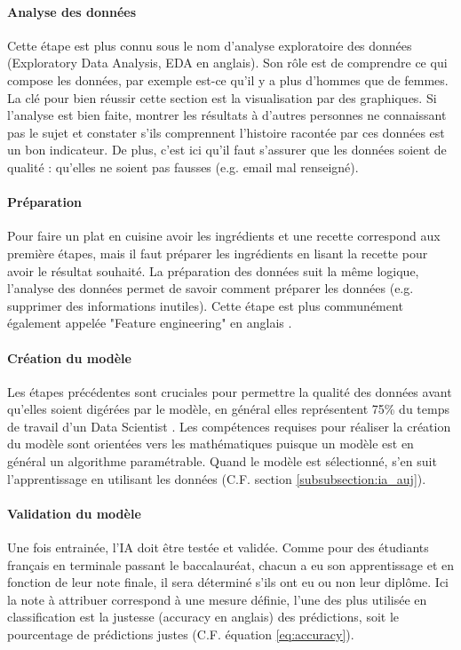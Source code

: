 \documentclass[10pt, french, a4paper]{article}
\begin{document}
\paragraph{Analyse des données}
Cette étape est plus connu sous le nom d'analyse exploratoire des données (Exploratory Data Analysis, EDA en anglais). Son rôle est de comprendre ce qui compose les données, par exemple est-ce qu'il y a plus d'hommes que de femmes. La clé pour bien réussir cette section est la visualisation par des graphiques. Si l'analyse est bien faite, montrer les résultats à d'autres personnes ne connaissant pas le sujet et constater s'ils comprennent l'histoire racontée par ces données est un bon indicateur. De plus, c'est ici qu'il faut s'assurer que les données soient de qualité : qu'elles ne soient pas fausses (e.g. email mal renseigné).

\paragraph{Préparation}
Pour faire un plat en cuisine avoir les ingrédients et une recette correspond aux première étapes, mais il faut préparer les ingrédients en lisant la recette pour avoir le résultat souhaité. La préparation des données suit la même logique, l'analyse des données permet de savoir comment préparer les données (e.g. supprimer des informations inutiles). Cette étape est plus communément également appelée "Feature engineering" en anglais \citep{mayo_machine_2018}.

\paragraph{Création du modèle}
Les étapes précédentes sont cruciales pour permettre la qualité des données avant qu'elles soient digérées par le modèle, en général elles représentent 75\% du temps de travail d'un Data Scientist \citep{figure_eight_state_2019}. Les compétences requises pour réaliser la création du modèle sont orientées vers les mathématiques puisque un modèle est en général un algorithme paramétrable. Quand le modèle est sélectionné, s'en suit l'apprentissage en utilisant les données (C.F. section \ref{subsubsection:ia_auj}).

\paragraph{Validation du modèle}
Une fois entrainée, l'IA doit être testée et validée. Comme pour des étudiants français en terminale passant le baccalauréat, chacun a eu son apprentissage et en fonction de leur note finale, il sera déterminé s'ils ont eu ou non leur diplôme. Ici la note à attribuer correspond à une mesure définie, l'une des plus utilisée en classification est la justesse (accuracy en anglais) des prédictions, soit le pourcentage de prédictions justes (C.F. équation \ref{eq:accuracy}).
\end{document}
